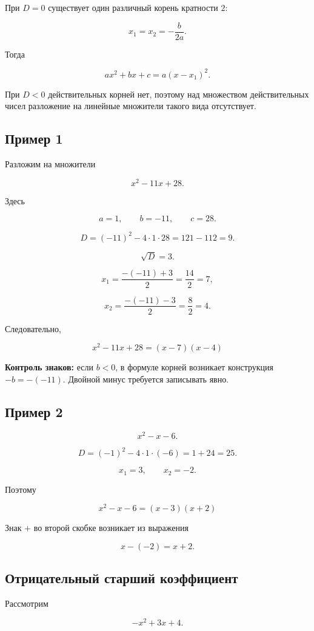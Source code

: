 \documentclass[a4paper,12pt]{article}
\newcommand{\term}[1]{\textbf{\color{darkaccent}#1}}
\begin{document}
При \(D=0\) существует один различный корень кратности \(2\):

\[
x_1=x_2=-\frac{b}{2a}.
\]

Тогда

\[
ax^2+bx+c=a(x-x_1)^2.
\]

При \(D<0\) действительных корней нет, поэтому над множеством действительных
чисел разложение на линейные множители такого вида отсутствует.

\subsection{Пример 1}

Разложим на множители

\[
x^2-11x+28.
\]

Здесь

\[
a=1,\qquad b=-11,\qquad c=28.
\]

\[
D=(-11)^2-4\cdot1\cdot28
=121-112=9.
\]

\[
\sqrt D=3.
\]

\[
x_1=\frac{-(-11)+3}{2}
=\frac{14}{2}=7,
\]

\[
x_2=\frac{-(-11)-3}{2}
=\frac{8}{2}=4.
\]

Следовательно,

\[
\boxed{
x^2-11x+28=(x-7)(x-4)
}
\]

\term{Контроль знаков:}
если \(b<0\), в формуле корней возникает конструкция
\(-b=-(-11)\). Двойной минус требуется записывать явно.

\subsection{Пример 2}

\[
x^2-x-6.
\]

\[
D=(-1)^2-4\cdot1\cdot(-6)
=1+24=25.
\]

\[
x_1=3,\qquad x_2=-2.
\]

Поэтому

\[
\boxed{
x^2-x-6=(x-3)(x+2)
}
\]

Знак \(+\) во второй скобке возникает из выражения

\[
x-(-2)=x+2.
\]

\subsection{Отрицательный старший коэффициент}

Рассмотрим

\[
-x^2+3x+4.
\]
\end{document}
